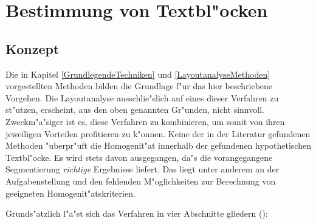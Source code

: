 \chapter{Bestimmung von Textbl"ocken}\label{BestimmungZones}



\section{Konzept}

Die in Kapitel \ref{GrundlegendeTechniken} und \ref{LayoutanalyseMethoden}
vorgestellten Methoden bilden die Grundlage f"ur das hier beschriebene Vorgehen.
Die Layoutanalyse ausschlie"slich auf eines dieser Verfahren zu st"utzen, erscheint, aus den oben
genannten Gr"unden, nicht sinnvoll. Zweckm"a"siger ist es, diese Verfahren zu kombinieren, um somit von ihren jeweiligen Vorteilen profitieren zu k"onnen. Keine der in der
Literatur gefundenen Methoden "uberpr"uft die Homogenit"at innerhalb der gefundenen hypothetischen
Textbl"ocke. Es wird stets davon ausgegangen, da"s die vorangegangene Segmentierung
  {\em richtige\/} Ergebnisse liefert. Das liegt unter anderem an der Aufgabenstellung und
den fehlenden M"oglichkeiten zur Berechnung von geeigneten Homogenit"atskriterien.

Grunds"atzlich l"a"st sich das Verfahren in vier Abschnitte gliedern ():

